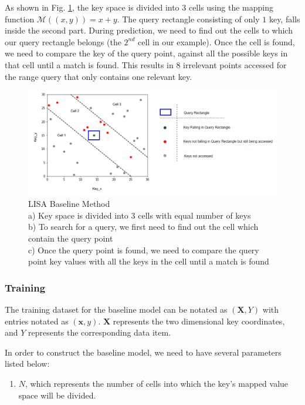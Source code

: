 \begin{mscexample}
As shown in Fig. \ref{fig:BaseLine_Method}, the key space is divided into 3 cells using the mapping function $\mathcal{M}((x,y))= x+y$. The query rectangle consisting of only $1$ key, falls inside the second part. During prediction, we need to find out the cells to which our query rectangle belongs (the $2^{nd}$ cell in our example). Once the cell is found, we need to compare the key of the query point, against all the possible keys in that cell until a match is found. This results in $8$ irrelevant points accessed for the range query that only contains one relevant key.
\end{mscexample}

\begin{figure}[t]
    \centering
    \includegraphics[width=1.1\textwidth]{graphs/implementation/Baseline_limitation_new.pdf}
    \caption{LISA Baseline Method \\
    a) Key space is divided into 3 cells with equal number of keys\\
    b) To search for a query, we first need to find out the cell which contain the query point\\
    c) Once the query point is found, we need to compare the query point key values with all the keys in the cell until a match is found}
    \label{fig:BaseLine_Method}
\end{figure}
\subsubsection{Training}

The training dataset for the baseline model can be notated as $(\boldsymbol{X}, Y)$ with entries notated as $(\boldsymbol{x},y)$. $\boldsymbol{X}$ represents the two dimensional key coordinates, and $Y$ represents the corresponding data item. 

In order to construct the baseline model, we need to have several parameters listed below:
\begin{enumerate}
	\item $N$, which represents the number of cells into which the key's mapped value space will be divided.
\end{enumerate}

